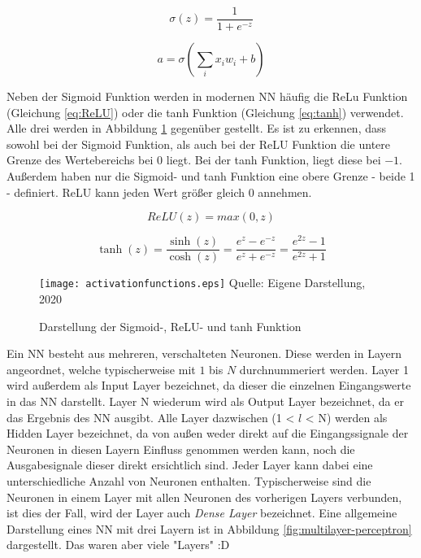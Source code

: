 \begin{equation} \label{eq:sigmoid}
    \sigma (z) =  \frac{1}{1+e^{-z}}
\end{equation}

\begin{equation} \label{eq:outputNeuron}
    a = \sigma (\sum_{i}{x_i w_i + b})
\end{equation}

Neben der Sigmoid Funktion werden in modernen \ac{NN} häufig die ReLu Funktion (Gleichung \ref{eq:ReLU}) oder die tanh Funktion (Gleichung \ref{eq:tanh}) verwendet. Alle drei werden in Abbildung \ref{fig:activationfunctions} gegenüber gestellt. Es ist zu erkennen, dass sowohl bei der Sigmoid Funktion, als auch bei der ReLU Funktion die untere Grenze des Wertebereichs bei $0$ liegt. Bei der tanh Funktion, liegt diese bei $-1$. Außerdem haben nur die Sigmoid- und tanh Funktion eine obere Grenze - beide 1 - definiert. ReLU kann jeden Wert größer gleich $0$ annehmen.

\begin{equation} \label{eq:ReLU}
    ReLU(z) = max(0,z)
\end{equation}

\begin{equation} \label{eq:tanh}
    \tanh(z) = \frac{\sinh(z)}{\cosh(z)} = \frac {e^z - e^{-z}} {e^z + e^{-z}}
  = \frac{e^{2z} - 1} {e^{2z} + 1}
\end{equation}

\begin{figure}[t]
    \centering
    \caption[]{Darstellung der Sigmoid-, ReLU- und tanh Funktion}
	\label{fig:activationfunctions}
    \texttt{[image: activationfunctions.eps]}
    Quelle: Eigene Darstellung, 2020
\end{figure}

Ein \ac{NN} besteht aus mehreren, verschalteten Neuronen. Diese werden in Layern angeordnet, welche typischerweise mit $1$ bis $N$ durchnummeriert werden. Layer 1 wird außerdem als Input Layer bezeichnet, da dieser die einzelnen Eingangswerte in das \ac{NN} darstellt. Layer N wiederum wird als Output Layer bezeichnet, da er das Ergebnis des \ac{NN} ausgibt. Alle Layer dazwischen (1 < $l$ < N) werden als Hidden Layer bezeichnet, da von außen weder direkt auf die Eingangssignale der Neuronen in diesen Layern Einfluss genommen werden kann, noch die Ausgabesignale dieser direkt ersichtlich sind. Jeder Layer kann dabei eine unterschiedliche Anzahl von Neuronen enthalten. Typischerweise sind die Neuronen in einem Layer mit allen Neuronen des vorherigen Layers verbunden, ist dies der Fall, wird der Layer auch \textit{Dense Layer} bezeichnet. Eine allgemeine Darstellung eines \ac{NN} mit drei Layern ist in Abbildung \ref{fig:multilayer-perceptron} dargestellt.
Das waren aber viele "Layers" :D

